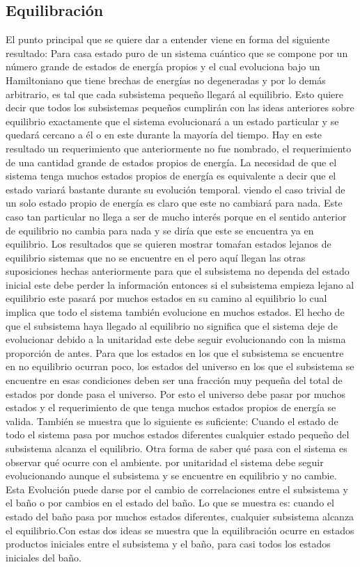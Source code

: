 \subsection{Equilibración}
El punto principal que se quiere dar a entender viene en forma del siguiente resultado: Para casa estado puro de un sistema cuántico que se compone por un número grande de estados de energía propios y el cual evoluciona bajo un Hamiltoniano que tiene brechas de energías no degeneradas y por lo demás arbitrario, es tal que cada subsistema pequeño llegará al equilibrio. Esto quiere decir que todos los subsistemas pequeños cumplirán con las ideas anteriores sobre equilibrio exactamente que el sistema evolucionará a un estado particular y se quedará cercano a él o en este durante la mayoría del tiempo.
Hay en este resultado un requerimiento que anteriormente no fue nombrado, el requerimiento de una cantidad grande de estados propios de energía. La necesidad de que el sistema tenga muchos estados propios de energía es equivalente a decir que el estado variará bastante durante su evolución temporal. viendo el caso trivial de un solo estado propio de energía es claro que este no cambiará para nada. Este caso tan particular no llega a ser de mucho interés porque en el sentido anterior de equilibrio no cambia para nada y se diría que este se encuentra ya en equilibrio. Los resultados que se quieren mostrar tomaŕan estados lejanos de equilibrio sistemas que no se encuentre en el pero aquí llegan las otras suposiciones hechas anteriormente para que el subsistema no dependa del estado inicial este debe perder la información entonces si el subsistema empieza lejano al equilibrio este pasará  por muchos estados en su camino al equilibrio lo cual implica que todo el sistema también evolucione en muchos estados. El hecho de que el subsistema haya llegado al equilibrio no significa que el sistema deje de evolucionar debido a la unitaridad este debe seguir evolucionando con la misma proporción de antes. Para que los estados en los que el subsistema se encuentre en no equilibrio ocurran poco, los estados del universo en los que el subsistema se encuentre en esas condiciones deben ser una fracción muy pequeña del total de estados por donde pasa el universo. Por esto el universo debe pasar por muchos estados y el requerimiento de que tenga muchos estados propios de energía se valida.
También se muestra que lo siguiente es suficiente: Cuando el estado de todo el sistema pasa por muchos estados diferentes cualquier estado pequeño del subsistema alcanza el equilibrio.
Otra forma de saber qué pasa con el sistema es observar qué ocurre con el ambiente. por unitaridad el sistema debe seguir evolucionando aunque el subsistema y se encuentre en equilibrio y no cambie. Esta Evolución puede darse por el cambio de correlaciones entre el subsistema y el baño o por cambios en el estado del baño. Lo que se muestra es: cuando el estado del baño pasa por muchos estados diferentes, cualquier subsistema alcanza el equilibrio.Con estas dos ideas se muestra que la equilibración ocurre en estados productos iniciales entre el subsistema y el baño, para casi todos los estados iniciales del baño.
